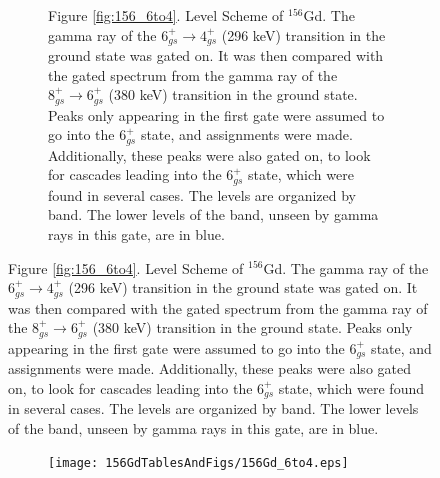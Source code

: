 \begin{landscape}
\begin{figure}[!]
    \centering
    \label{fig:156_6to4}
    \begin{subfigure}{1.4\textwidth}
    \caption*{\centering \fontsize{10pt}{12pt}Figure \ref{fig:156_6to4}. Level Scheme of $^{156}$Gd. The gamma ray of the $6^+_{gs}\rightarrow 4^+_{gs}$ (296 keV) transition in the ground state was gated on. It was then compared with the gated spectrum from the gamma ray of the $8^+_{gs}\rightarrow 6^+_{gs}$ (380 keV) transition in the ground state. Peaks only appearing in the first gate were assumed to go into the $6^+_{gs}$ state, and assignments were made. Additionally, these peaks were also gated on, to look for cascades leading into the $6^+_{gs}$ state, which were found in several cases. The levels are organized by band. The lower levels of the band, unseen by gamma rays in this gate, are in blue.}
    \end{subfigure}
\end{figure}
\clearpage
\begin{figure}
    \ContinuedFloat
    \begin{subfigure}{1.4\textwidth}
        \texttt{[image: 156GdTablesAndFigs/156Gd\_6to4.eps]}
    \label{fig:156_6to4level}
    \end{subfigure}
\end{figure}
\end{landscape}
